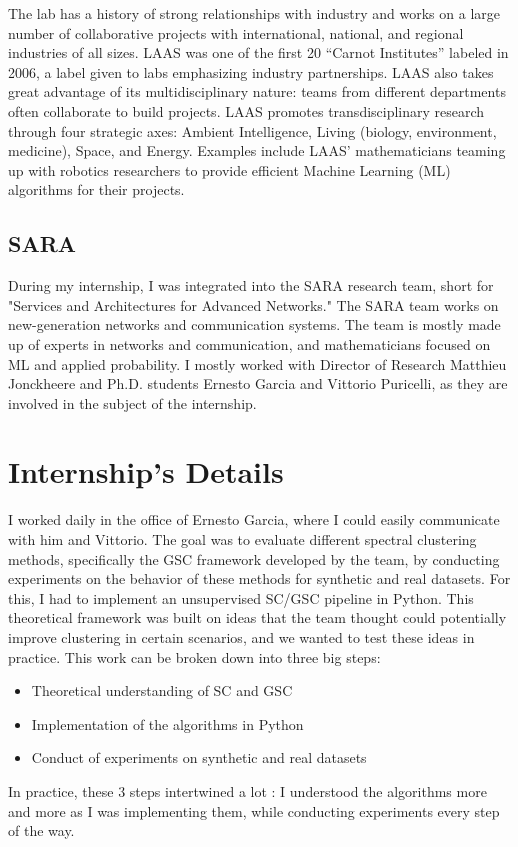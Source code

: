 \documentclass[a4paper,12pt]{article}
\theoremstyle{definition}
\theoremstyle{plain}
\begin{document}
The lab has a history of strong relationships with industry and works on a large number of collaborative projects with international, national, and regional industries of all sizes. LAAS was one of the first 20 “Carnot Institutes” labeled in 2006, a label given to labs emphasizing industry partnerships. LAAS also takes great advantage of its multidisciplinary nature: teams from different departments often collaborate to build projects. LAAS promotes transdisciplinary research through four strategic axes: Ambient Intelligence, Living (biology, environment, medicine), Space, and Energy. Examples include LAAS' mathematicians teaming up with robotics researchers to provide efficient Machine Learning (ML) algorithms for their projects.

\subsection{SARA}
During my internship, I was integrated into the SARA research team, short for "Services and Architectures for Advanced Networks." The SARA team works on new-generation networks and communication systems. The team is mostly made up of experts in networks and communication, and mathematicians focused on ML and applied probability. I mostly worked with Director of Research Matthieu Jonckheere and Ph.D. students Ernesto Garcia and Vittorio Puricelli, as they are involved in the subject of the internship.

\section{Internship's Details}
I worked daily in the office of Ernesto Garcia, where I could easily communicate with him and Vittorio. The goal was to evaluate different spectral clustering methods, specifically the GSC framework developed by the team, by conducting experiments on the behavior of these methods for synthetic and real datasets. For this, I had to implement an unsupervised SC/GSC pipeline in Python. This theoretical framework was built on ideas that the team thought could potentially improve clustering in certain scenarios, and we wanted to test these ideas in practice. This work can be broken down into three big steps:
\begin{itemize}
	\item Theoretical understanding of SC and GSC
	\item Implementation of the algorithms in Python
	\item Conduct of experiments on synthetic and real datasets
\end{itemize}
In practice, these $3$ steps intertwined a lot : I understood the algorithms more and more as I was implementing them, while conducting experiments every step of the way.
\end{document}
